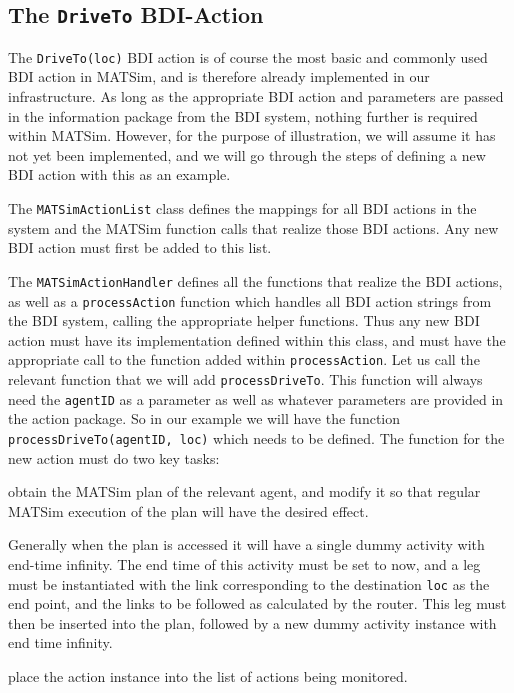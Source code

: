 \subsection{The \texttt{DriveTo} BDI-Action}
The \texttt{DriveTo(loc)} BDI action is of course the most basic and
commonly used BDI action in MATSim, and is therefore already
implemented in our infrastructure. As long as the appropriate BDI
action and parameters are passed in the information package from the
BDI system, nothing further is required within MATSim. However, for
the purpose of illustration, we will assume it has not yet been
implemented, and we will go through the steps of defining a new BDI
action with this as an example.

The \texttt{MATSimActionList} class defines the mappings for all BDI
actions in the system and the MATSim function calls that realize those
BDI actions.  Any new BDI action must first be added to this list.

The \texttt{MATSimActionHandler} defines all the functions that
realize the BDI actions, as well as a \texttt{processAction} function
which handles all BDI action strings from the BDI system,
calling the appropriate helper functions. Thus any new BDI action must have
its implementation defined within this class, and must have the appropriate
call to the function added within \texttt{processAction}.  Let us call
the relevant function that we will add \texttt{processDriveTo}. This function
will always need the \texttt{agentID} as a parameter as well as
whatever parameters are provided in the action package. So in our
example we will have the function \texttt{processDriveTo(agentID, loc)}
which needs to be defined. 
%
The function for the new action must do two key tasks:
\begin{tightenumerate}
\item obtain the MATSim plan of the relevant agent, and modify it so
  that regular MATSim execution of the plan will have the desired
  effect.

Generally when the plan is accessed it will have a single dummy
activity with end-time infinity. The end time of this activity must be
set to now, and a leg must be instantiated with the link corresponding
to the destination \texttt{loc} as the end point, and the links to be
followed as calculated by the router. This leg must then be inserted
into the plan, followed by a new dummy activity instance with end time
infinity. 

\item place the action instance into the list of actions being
  monitored. 
\end{tightenumerate}

